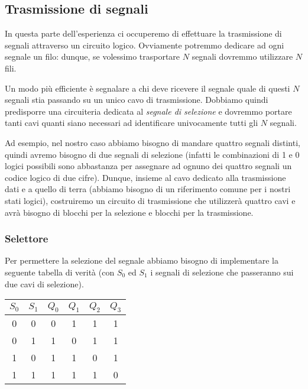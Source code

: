 \subsection{Trasmissione di segnali}

In questa parte dell'esperienza ci occuperemo di effettuare la trasmissione di segnali attraverso un circuito logico. Ovviamente potremmo dedicare ad ogni segnale un filo: dunque, se volessimo trasportare $N$ segnali dovremmo utilizzare $N$ fili.

Un modo più efficiente è segnalare a chi deve ricevere il segnale quale di questi $N$ segnali stia passando su un unico cavo di trasmissione. Dobbiamo quindi predisporre una circuiteria dedicata al \textit{segnale di selezione} e dovremmo portare tanti cavi quanti siano necessari ad identificare univocamente tutti gli $N$ segnali.

Ad esempio, nel nostro caso abbiamo bisogno di mandare quattro segnali distinti, quindi avremo bisogno di due segnali di selezione (infatti le combinazioni di 1 e 0 logici possibili sono abbastanza per assegnare ad ognuno dei quattro segnali un codice logico di due cifre). Dunque, insieme al cavo dedicato alla trasmissione dati e a quello di terra (abbiamo bisogno di un riferimento comune per i nostri stati logici), costruiremo un circuito di trasmissione che utilizzerà quattro cavi e avrà bisogno di blocchi per la selezione e blocchi per la trasmissione.

\subsubsection{Selettore}

Per permettere la selezione del segnale abbiamo bisogno di implementare la seguente tabella di verità (con $S_0$ ed $S_1$ i segnali di selezione che passeranno sui due cavi di selezione).

\begin{table}[htpc]
\centering
{\renewcommand{\arraystretch}{1.1}%
\begin{tabular}{|c|c|c|c|c|c|}
\hline
$S_0$ & $S_1$ & $Q_0$ & $Q_1$ & $Q_2$ & $Q_3$ \\
\hline
0 & 0 & 0 & 1 & 1 & 1\\
\hline
0 & 1 & 1 & 0 & 1 & 1\\
\hline
1 & 0 & 1 & 1 & 0 & 1\\
\hline
1 & 1 & 1 & 1 & 1 & 0\\
\hline
\end{tabular}}
\label{tab10:multiplx_selezione}
\end{table}

